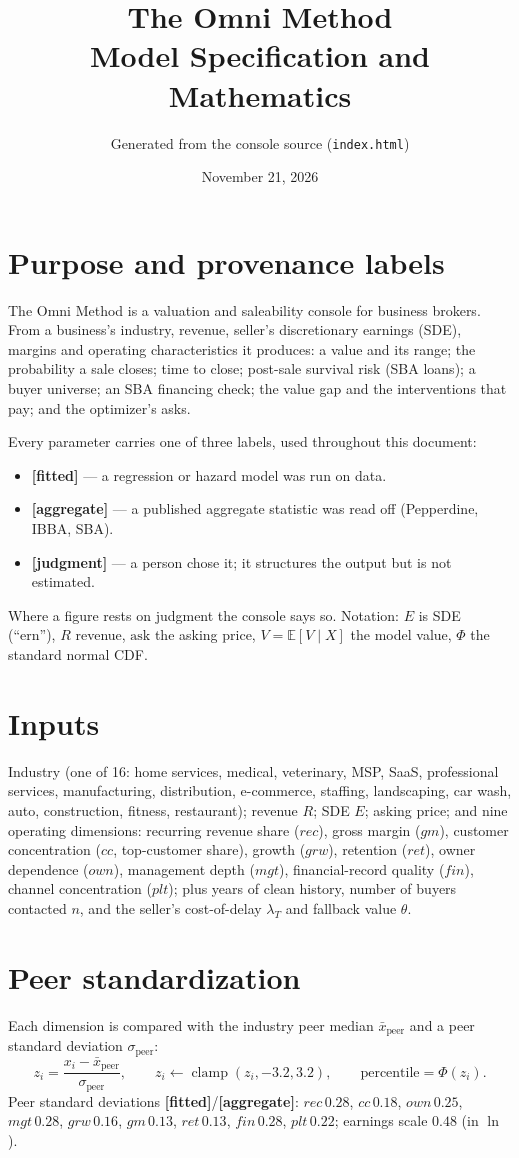 \documentclass[11pt]{article}
\title{\textbf{The Omni Method}\\[2pt]\large Model Specification and Mathematics}
\author{Generated from the console source (\texttt{index.html})}
\date{November 21, 2026}
\DeclareMathOperator{\clamp}{clamp}
\newcommand{\EV}[1]{\mathbb{E}\!\left[#1\right]}
\newcommand{\fit}{\textbf{[fitted]}}
\newcommand{\agg}{\textbf{[aggregate]}}
\newcommand{\jud}{\textbf{[judgment]}}
\begin{document}
\maketitle
\tableofcontents
\newpage

\section{Purpose and provenance labels}
The Omni Method is a valuation and saleability console for business brokers. From a business's industry, revenue, seller's discretionary earnings (SDE), margins and operating characteristics it produces: a value and its range; the probability a sale closes; time to close; post-sale survival risk (SBA loans); a buyer universe; an SBA financing check; the value gap and the interventions that pay; and the optimizer's asks.

Every parameter carries one of three labels, used throughout this document:
\begin{itemize}[nosep]
\item \fit{} --- a regression or hazard model was run on data.
\item \agg{} --- a published aggregate statistic was read off (Pepperdine, IBBA, SBA).
\item \jud{} --- a person chose it; it structures the output but is not estimated.
\end{itemize}
Where a figure rests on judgment the console says so. Notation: $E$ is SDE (``ern''), $R$ revenue, $\text{ask}$ the asking price, $V=\EV{V\mid X}$ the model value, $\Phi$ the standard normal CDF.

\section{Inputs}
Industry (one of 16: home services, medical, veterinary, MSP, SaaS, professional services, manufacturing, distribution, e-commerce, staffing, landscaping, car wash, auto, construction, fitness, restaurant); revenue $R$; SDE $E$; asking price; and nine operating dimensions: recurring revenue share ($rec$), gross margin ($gm$), customer concentration ($cc$, top-customer share), growth ($grw$), retention ($ret$), owner dependence ($own$), management depth ($mgt$), financial-record quality ($fin$), channel concentration ($plt$); plus years of clean history, number of buyers contacted $n$, and the seller's cost-of-delay $\lambda_T$ and fallback value $\theta$.

\section{Peer standardization}
Each dimension is compared with the industry peer median $\bar x_{\text{peer}}$ and a peer standard deviation $\sigma_{\text{peer}}$:
\[
z_i=\frac{x_i-\bar x_{\text{peer}}}{\sigma_{\text{peer}}},\qquad z_i\leftarrow\clamp(z_i,-3.2,3.2),\qquad \text{percentile}=\Phi(z_i).
\]
Peer standard deviations \fit/\agg: $rec\,0.28$, $cc\,0.18$, $own\,0.25$, $mgt\,0.28$, $grw\,0.16$, $gm\,0.13$, $ret\,0.13$, $fin\,0.28$, $plt\,0.22$; earnings scale $0.48$ (in $\ln$).
\end{document}
